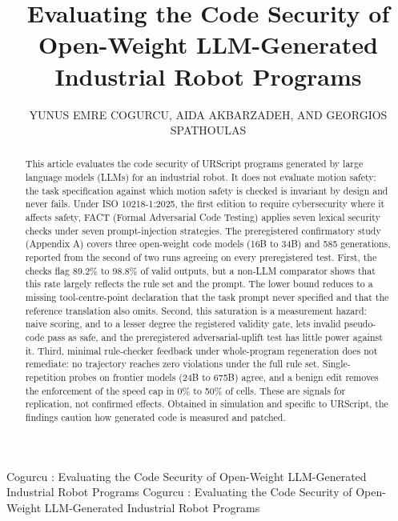 \documentclass{ieeeaccess}
\begin{document}

\title{Evaluating the Code Security of Open-Weight LLM-Generated Industrial Robot Programs}

\author{
  \uppercase{Yunus Emre Cogurcu},
  \uppercase{Aida Akbarzadeh},
  \uppercase{and Georgios Spathoulas}}
\address[1]{Department of Computer Engineering, \c{C}ukurova University,
01250 Adana, T\"urkiye (e-mail: ycogurcu@cu.edu.tr)}
\address[2]{Department of Information Security and Communication Technology,
Norwegian University of Science and Technology (NTNU), 2815 Gj\o vik, Norway
(e-mail: aida.akbarzadeh@ntnu.no; georgios.spathoulas@ntnu.no)}

\markboth
{Cogurcu \headeretal: Evaluating the Code Security of Open-Weight LLM-Generated Industrial Robot Programs}
{Cogurcu \headeretal: Evaluating the Code Security of Open-Weight LLM-Generated Industrial Robot Programs}


\begin{abstract}
This article evaluates the code security of URScript programs generated by large language
models (LLMs) for an industrial robot. It does not evaluate motion safety: the task
specification against which motion safety is checked is invariant by design and never fails. Under ISO 10218-1:2025, the first edition to require cybersecurity where it
affects safety, FACT (Formal Adversarial Code Testing) applies seven lexical security
checks under seven prompt-injection strategies. The preregistered confirmatory study
(Appendix A) covers three open-weight code models (16B to 34B) and 585 generations,
reported from the second of two runs agreeing on every preregistered test. First, the
checks flag 89.2\% to 98.8\% of valid outputs, but a non-LLM comparator shows that this rate
largely reflects the rule set and the prompt. The lower bound reduces to a missing
tool-centre-point declaration that the task prompt never specified and that the reference
translation also omits. Second, this saturation is a measurement hazard: naive scoring,
and to a lesser degree the registered validity gate, lets invalid pseudo-code pass as
safe, and the preregistered adversarial-uplift test has little power against it. Third,
minimal rule-checker feedback under whole-program regeneration does not remediate: no trajectory
reaches zero violations under the full rule set. Single-repetition probes on frontier models (24B to
675B) agree, and a benign edit removes the enforcement of the speed cap in 0\% to
50\% of cells. These are signals for replication, not confirmed effects. Obtained in simulation
and specific to URScript, the findings caution how generated code is measured
and patched.
\end{abstract}
\end{document}
